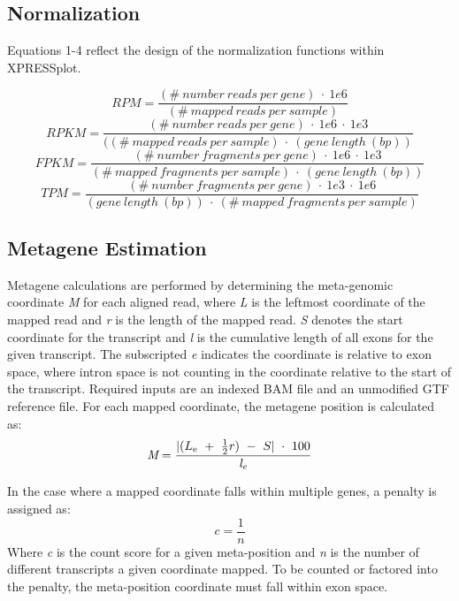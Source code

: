 \documentclass[11pt, a4paper, oneside]{article}
\begin{document}
\subsection{Normalization}
Equations 1-4 reflect the design of the normalization functions within XPRESSplot.

  \begin{equation}
    RPM = \frac{(\#\ number\ reads\ per\ gene)\ \cdot\ 1e6}{(\#\ mapped\ reads\ per\ sample)}
  \end{equation}
  \begin{equation}
    RPKM = \frac{(\#\ number\ reads\ per\ gene)\ \cdot\ 1e6\ \cdot\ 1e3}{((\#\ mapped\ reads\ per\ sample)\ \cdot\ (gene\ length\ (bp))}
  \end{equation}
  \begin{equation}
    FPKM = \frac{(\#\ number\ fragments\ per\ gene)\ \cdot\ 1e6\ \cdot\ 1e3}{(\#\ mapped\ fragments\ per\ sample)\ \cdot\ (gene\ length\ (bp))}
  \end{equation}
  \begin{equation}
    TPM = \frac{(\#\ number\ fragments\ per\ gene)\ \cdot\ 1e3\ \cdot\ 1e6}{(gene\ length\ (bp))\ \cdot\ (\#\ mapped\ fragments\ per\ sample)}
  \end{equation}

\subsection{Metagene Estimation}
Metagene calculations are performed by determining the meta-genomic coordinate \textit{M} for each aligned read, where \textit{L} is the leftmost coordinate of the mapped read and \textit{r} is the length of the mapped read. \textit{S} denotes the start coordinate for the transcript and \textit{l} is the cumulative length of all exons for the given transcript. The subscripted \textit{e} indicates the coordinate is relative to exon space, where intron space is not counting in the coordinate relative to the start of the transcript. Required inputs are an indexed BAM file and an unmodified GTF reference file. For each mapped coordinate, the metagene position is calculated as:
\begin{equation}
\textit{M} = \frac{|(L\textsubscript{e}\ +\ \frac{1}{2}r)\ -\ S|\ \cdot\ 100}{\textit{l\textsubscript{e}}}
\end{equation}

In the case where a mapped coordinate falls within multiple genes, a penalty is assigned as:
\begin{equation}
  \textit{c} = \frac{1}{\textit{n}}
\end{equation}
Where \textit{c} is the count score for a given meta-position and \textit{n} is the number of different transcripts a given coordinate mapped. To be counted or factored into the penalty, the meta-position coordinate must fall within exon space.
\end{document}
